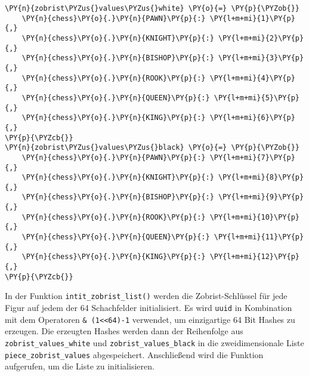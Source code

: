     \begin{tcolorbox}[fontupper=\linespread{.66}\selectfont, breakable, size=fbox, boxrule=1pt, pad at break*=1mm,colback=cellbackground, colframe=cellborder]
\begin{Verbatim}[commandchars=\\\{\}]
\PY{n}{zobrist\PYZus{}values\PYZus{}white} \PY{o}{=} \PY{p}{\PYZob{}}
    \PY{n}{chess}\PY{o}{.}\PY{n}{PAWN}\PY{p}{:} \PY{l+m+mi}{1}\PY{p}{,}
    \PY{n}{chess}\PY{o}{.}\PY{n}{KNIGHT}\PY{p}{:} \PY{l+m+mi}{2}\PY{p}{,}
    \PY{n}{chess}\PY{o}{.}\PY{n}{BISHOP}\PY{p}{:} \PY{l+m+mi}{3}\PY{p}{,}
    \PY{n}{chess}\PY{o}{.}\PY{n}{ROOK}\PY{p}{:} \PY{l+m+mi}{4}\PY{p}{,}
    \PY{n}{chess}\PY{o}{.}\PY{n}{QUEEN}\PY{p}{:} \PY{l+m+mi}{5}\PY{p}{,}
    \PY{n}{chess}\PY{o}{.}\PY{n}{KING}\PY{p}{:} \PY{l+m+mi}{6}\PY{p}{,}
\PY{p}{\PYZcb{}}
\PY{n}{zobrist\PYZus{}values\PYZus{}black} \PY{o}{=} \PY{p}{\PYZob{}}
    \PY{n}{chess}\PY{o}{.}\PY{n}{PAWN}\PY{p}{:} \PY{l+m+mi}{7}\PY{p}{,}
    \PY{n}{chess}\PY{o}{.}\PY{n}{KNIGHT}\PY{p}{:} \PY{l+m+mi}{8}\PY{p}{,}
    \PY{n}{chess}\PY{o}{.}\PY{n}{BISHOP}\PY{p}{:} \PY{l+m+mi}{9}\PY{p}{,}
    \PY{n}{chess}\PY{o}{.}\PY{n}{ROOK}\PY{p}{:} \PY{l+m+mi}{10}\PY{p}{,}
    \PY{n}{chess}\PY{o}{.}\PY{n}{QUEEN}\PY{p}{:} \PY{l+m+mi}{11}\PY{p}{,}
    \PY{n}{chess}\PY{o}{.}\PY{n}{KING}\PY{p}{:} \PY{l+m+mi}{12}\PY{p}{,}
\PY{p}{\PYZcb{}}
\end{Verbatim}
\end{tcolorbox}

    In der Funktion \texttt{intit\_zobrist\_list()} werden die
Zobrist-Schlüssel für jede Figur auf jedem der 64 Schachfelder
initialisiert. Es wird \texttt{uuid} in Kombination mit dem Operatoren
\texttt{\&\ (1\textless{}\textless{}64)-1} verwendet, um einzigartige 64
Bit Hashes zu erzeugen. Die erzeugten Hashes werden dann der Reihenfolge
aus \texttt{zobrist\_values\_white} und \texttt{zobrist\_values\_black}
in die zweidimensionale Liste \texttt{piece\_zobrist\_values}
abgespeichert. Anschließend wird die Funktion aufgerufen, um die Liste
zu initialisieren.

\bigskip

